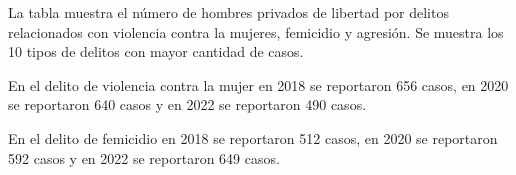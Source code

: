\justifying La tabla muestra el número de hombres privados de libertad por delitos relacionados con violencia contra la mujeres, femicidio y agresión. Se muestra los 10 tipos de delitos con mayor cantidad de casos. 

En el delito de violencia contra la mujer en 2018 se reportaron 656 casos, en 2020 se reportaron 640 casos y en 2022 se reportaron 490 casos. 

En el delito de femicidio en 2018 se reportaron 512 casos, en 2020 se reportaron 592 casos y en 2022 se reportaron 649 casos. 
